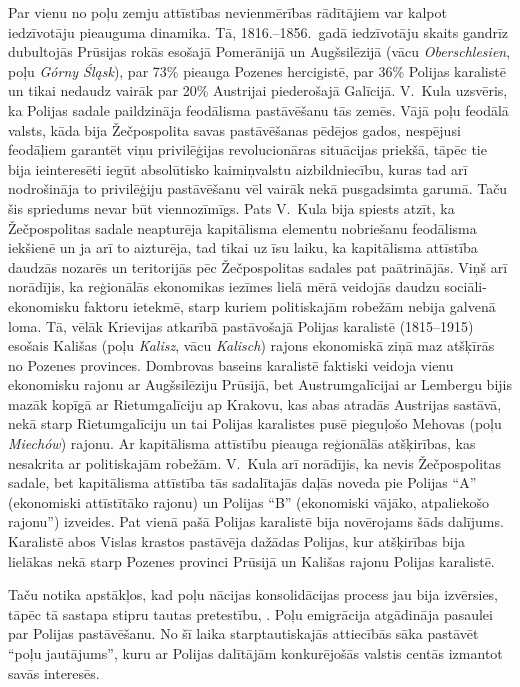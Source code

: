 \documentclass[twoside,a5paper,12pt,fleqn,openany]{extbook}
\newcommand{\asterism}{\vspace{1em}{\centering\Large\bfseries$\ast~\ast~\ast$\par}\vspace{1em}}
\newcommand{\pltxti}[1]{\textit{\textpolish{#1}}}
\newcommand{\detxti}[1]{\textit{\textgerman{#1}}}
\begin{document}
Par vienu no poļu zemju attīstības nevienmērības rādītājiem var kalpot iedzīvotāju pieauguma dinamika. Tā, 1816.--1856.~gadā iedzīvotāju skaits gandrīz dubultojās Prūsijas rokās esošajā Pomerānijā un Augšsilēzijā (vācu \detxti{Oberschlesien}, poļu \pltxti{Górny Śląsk}), par 73\% pieauga Pozenes hercigistē, par 36\% Polijas karalistē un tikai nedaudz vairāk par 20\% Austrijai piederošajā Galīcijā. V.~Kula uzsvēris, ka Polijas sadale paildzināja feodālisma pastāvēšanu tās zemēs. Vājā poļu feodālā valsts, kāda bija Žečpospolita savas pastāvēšanas pēdējos gados, nespējusi feodāļiem garantēt viņu privilēģijas revolucionāras situācijas priekšā, tāpēc tie bija ieinteresēti iegūt absolūtisko kaimiņvalstu aizbildniecību, kuras tad arī nodrošināja to privilēģiju pastāvēšanu vēl vairāk nekā pusgadsimta garumā. Taču šis spriedums nevar būt viennozīmīgs. Pats V.~Kula bija spiests atzīt, ka Žečpospolitas sadale neapturēja kapitālisma elementu nobriešanu feodālisma iekšienē un ja arī to aizturēja, tad tikai uz īsu laiku, ka kapitālisma attīstība daudzās nozarēs un teritorijās pēc Žečpospolitas sadales pat paātrinājās. Viņš arī norādījis, ka reģionālās ekonomikas iezīmes lielā mērā veidojās daudzu sociāli-ekonomisku faktoru ietekmē, starp kuriem politiskajām robežām nebija galvenā loma. Tā, vēlāk Krievijas atkarībā pastāvošajā Polijas karalistē (1815--1915) esošais Kališas (poļu \pltxti{Kalisz}, vācu \detxti{Kalisch}) rajons ekonomiskā ziņā maz atšķīrās no Pozenes provinces. Dombrovas baseins karalistē faktiski veidoja vienu ekonomisku rajonu ar Augšsilēziju Prūsijā, bet Austrumgalīcijai ar Lembergu bijis mazāk kopīgā ar Rietumgalīciju ap Krakovu, kas abas atradās Austrijas sastāvā, nekā starp Rietumgalīciju un tai Polijas karalistes pusē pieguļošo Mehovas (poļu \pltxti{Miechów}) rajonu. Ar kapitālisma attīstību pieauga reģionālās atšķirības, kas nesakrita ar politiskajām robežām. V.~Kula arī norādījis, ka nevis Žečpospolitas sadale, bet kapitālisma attīstība tās sadalītajās daļās noveda pie Polijas ``A'' (ekonomiski attīstītāko rajonu) un Polijas ``B'' (ekonomiski vājāko, atpaliekošo rajonu'') izveides. Pat vienā pašā Polijas karalistē bija novērojams šāds dalījums. Karalistē abos Vislas krastos pastāvēja dažādas Polijas, kur atšķirības bija lielākas nekā starp Pozenes provinci Prūsijā un Kališas rajonu Polijas karalistē.

\asterism


Taču  notika apstākļos, kad poļu nācijas konsolidācijas process jau bija izvērsies, tāpēc tā sastapa stipru tautas pretestību, . Poļu emigrācija atgādināja pasaulei par Polijas pastāvēšanu. No šī laika starptautiskajās attiecībās sāka pastāvēt ``poļu jautājums'', kuru ar Polijas dalītājām konkurējošās valstis centās izmantot savās interesēs.
\end{document}
